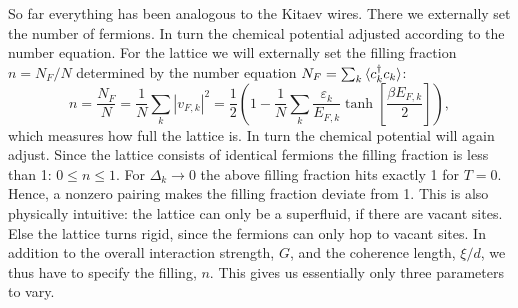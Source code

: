So far everything has been analogous to the Kitaev wires. There we externally set the number of fermions. In turn the chemical potential adjusted according to the number equation. For the lattice we will externally set the filling fraction $n = N_F / N$ determined by the number equation $N_F = \sum_k \braket{c^\dagger_k c_k}$:
\begin{equation}
n = \frac{N_F}{N} = \frac{1}{N}\sum_k |v_{F,k}|^2 = \frac{1}{2}\left(1 - \frac{1}{N}\sum_k \frac{\varepsilon_k}{E_{F,k}}\tanh\left[\frac{\beta E_{F,k}}{2} \right] \right), 
\label{eq.fillingfraction.lattice}
\end{equation}
which measures how full the lattice is. In turn the chemical potential will again adjust. Since the lattice consists of identical fermions the filling fraction is less than 1: $0 \leq n \leq 1$. For $\Delta_k \to 0$ the above filling fraction hits exactly 1 for $T = 0$. Hence, a nonzero pairing makes the filling fraction deviate from 1. This is also physically intuitive: the lattice can only be a superfluid, if there are vacant sites. Else the lattice turns rigid, since the fermions can only hop to vacant sites. In addition to the overall interaction strength, $G$, and the coherence length, $\xi / d$, we thus have to specify the filling, $n$. This gives us essentially only three parameters to vary. 

